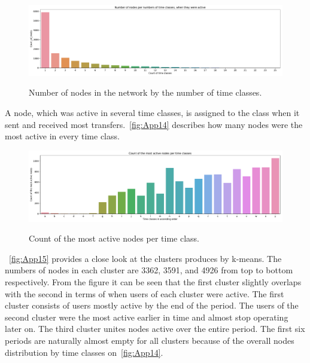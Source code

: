 \begin{figure}[!ht]
	\centering
	\includegraphics[width=1.0\textwidth]{images/appendix/App13.pdf}\\
	\caption{Number of nodes in the network by the number of time classes.}
	\label{fig:App13}
\end{figure}

A node, which was active in several time classes, is assigned to the class when it sent and received most transfers.~\autoref{fig:App14} describes how many nodes were the most active in every time class.

\begin{figure}[!ht]
	\centering
	\includegraphics[width=1.0\textwidth]{images/appendix/App14.pdf}\\
	\caption{Count of the most active nodes per time class.}
	\label{fig:App14}
\end{figure}

~\autoref{fig:App15} provides a close look at the clusters produces by k-means. The numbers of nodes in each cluster are 3362, 3591, and  4926 from top to bottom respectively. From the figure it can be seen that the first cluster slightly overlaps with the second in terms of when users of each cluster were active. The first cluster consists of users mostly active by the end of the period. The users of the second cluster were the most active earlier in time and almost stop operating later on.  The third cluster unites nodes active over the entire period. The first six periods are naturally almost empty for all clusters because of the overall nodes distribution by time classes on~\autoref{fig:App14}.

